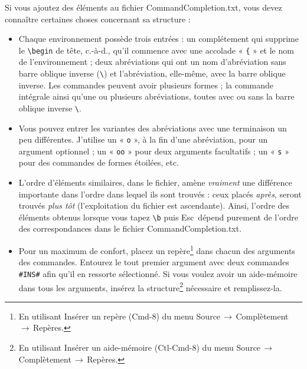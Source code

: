 \documentclass[11pt,french]{article}
\newcommand{\ctlkey}{\textsf{Ctl}}
\newcommand{\cmdkey}{\textsf{Cmd}}
\newcommand{\esckey}{\textsf{Esc}}
\newcommand{\mnu}[1]{\textsf{#1}}
\newcommand{\To}{\,\(\to\)\,}
\newcommand{\CCT}{\textsf{CommandCompletion.txt}}
\begin{document}
Si vous ajoutez des éléments au fichier \CCT{}, vous devez connaître certaines choses concernant sa structure :
\begin{itemize}
\item 
Chaque environnement possède trois entrées : un complétement qui supprime le \verb|\begin| de tête, c.-à-d., qu'il commence avec une accolade « \texttt{\{} » et le nom de l'environnement ; deux abréviations qui ont un nom d'abréviation sans barre oblique inverse (\verb|\|) et l'abréviation, elle-même, avec la barre oblique inverse. Les commandes peuvent avoir plusieurs formes ; la commande intégrale ainsi qu'une ou plusieurs abréviations, toutes avec ou sans la barre oblique inverse \verb|\|.
\item 
Vous pouvez entrer les variantes des abréviations avec une terminaison un peu différentes. J'utilise un « \texttt{o} », à la fin d'une abréviation, pour un argument optionnel ; un « \texttt{oo} » pour deux arguments facultatifs ; un « \texttt{s} » pour des commandes de formes étoilées, etc.
\item 
L'ordre d'éléments similaires, dans le fichier, amène \emph{vraiment} une différence importante dans l'ordre dans lequel ils sont trouvés : ceux placés \emph{après}, seront trouvés \emph{plus tôt} (l'exploitation du fichier est ascendante). Ainsi, l'ordre des éléments obtenus lorsque vous tapez \verb|\b| puis \esckey\ dépend purement de l'ordre des correspondances dans le fichier \CCT.
\item 
Pour un maximum de confort, placez un repère\footnote{En utilisant \mnu{Insérer un repère} (\cmdkey-\textsf{8}) du menu \mnu{Source}\To\mnu{Complètement}\To\mnu{Repères}.} dans chacun des arguments des commandes. Entourez le tout premier argument avec deux commandes \verb|#INS#| afin qu'il en ressorte sélectionné. Si vous voulez avoir un aide-mémoire dans tous les arguments, insérez la structure\footnote{En utilisant \mnu{Insérer un aide-mémoire} (\ctlkey-\cmdkey-\textsf{8}) du menu \mnu{Source}\To\mnu{Complètement}\To\mnu{Repères}.} nécessaire et remplissez-la.
\end{itemize}%
\end{document}
